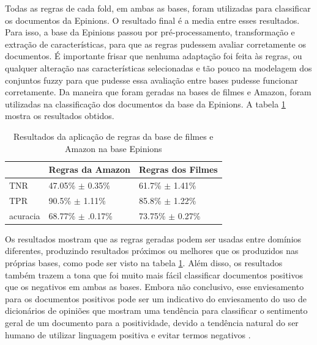 \documentclass[template.tex]{subfiles}
\begin{document}
Todas as regras de cada fold, em ambas as bases, foram utilizadas para classificar os documentos da Epinions. O resultado final é a media entre esses resultados. Para isso, a base da Epinions passou por pré-processamento, transformação e extração de características, para que as regras pudessem avaliar corretamente os documentos. É importante frisar que nenhuma adaptação foi feita às regras, ou qualquer alteração nas características selecionadas e tão pouco na modelagem dos conjuntos fuzzy para que pudesse essa avaliação entre bases pudesse funcionar corretamente. Da maneira que foram geradas na bases de filmes e Amazon, foram utilizadas na classificação dos documentos da base da Epinions. A tabela \ref{table:epinions} mostra os resultados obtidos.

\begin{table}[!h]
    \begin{tabular}{lll}
    ~               & Regras da Amazon                  & Regras dos Filmes \\ \hline
    TNR             & 47.05\% $\pm$ 0.35\%           & 61.7\% $\pm$ 1.41\%    \\
    TPR         & 90.5\% $\pm$ 1.11\%               & 85.8\% $\pm$ 1.22\%   \\
    acuracia    & 68.77\% $\pm$ .0.17\%             & 73.75\% $\pm$ 0.27\%    \\
    \end{tabular}
    \caption{Resultados da aplicação de regras da base de filmes e Amazon na base Epinions}
    \label{table:epinions}
\end{table}


Os resultados mostram que as regras geradas podem ser usadas entre domínios diferentes, produzindo resultados próximos ou melhores que os produzidos nas próprias bases, como pode ser visto na tabela \ref{table:epinions}. Além disso, os resultados também trazem a tona que foi muito mais fácil classificar documentos positivos que os negativos em ambas as bases. Embora não conclusivo, esse enviesamento para os documentos positivos pode ser um indicativo do enviesamento do uso de dicionários de opiniões que mostram uma tendência para classificar o sentimento geral de um documento para a positividade, devido a tendência natural do ser humano de utilizar linguagem positiva e evitar termos negativos \cite{boucher1969pollyanna, kennedy2006sentiment}.
\end{document}
